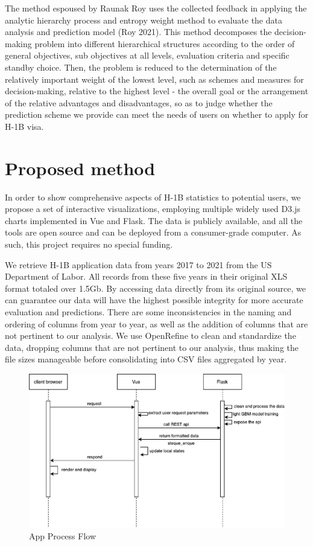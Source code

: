 \documentclass[sigconf]{acmart}
\begin{document}
The method espoused by Raunak Roy uses the collected feedback in applying the analytic hierarchy process and entropy 
weight method to evaluate the data analysis and prediction model (Roy 2021). This method decomposes the decision-making problem into different 
hierarchical structures according to the order of general objectives, sub objectives at all levels, evaluation criteria and specific 
standby choice. Then, the problem is reduced to the determination of the relatively important weight of the lowest level, such as 
schemes and measures for decision-making, relative to the highest level - the overall goal or the arrangement of the relative 
advantages and disadvantages, so as to judge whether the prediction scheme we provide can meet the needs of users on whether to 
apply for H-1B visa.


\section{Proposed method}


In order to show comprehensive aspects of H-1B statistics to potential users, we propose a set of interactive visualizations, 
employing multiple widely used D3.js charts implemented in Vue and Flask.  The data is publicly available, and all the tools 
are open source and can be deployed from a consumer-grade computer. As such, this project requires no special funding. 



We retrieve H-1B application data from years 2017 to 2021 from the US Department of Labor. All records from these five 
years in their original XLS format totaled over 1.5Gb. By accessing data directly from its original source, we can 
guarantee our data will have the highest possible integrity for more accurate evaluation and predictions. 
There are some inconsistencies in the naming and ordering of columns from year to year, as well as the addition of columns that are not pertinent to 
our analysis.  We use OpenRefine to clean and standardize the data, dropping columns that are not pertinent to our 
analysis, thus making the file sizes manageable before consolidating into CSV files aggregated by year. 
\begin{figure}
  \includegraphics[width=\linewidth]{fig4.png}
  \caption{App Process Flow}
  \label{fig:appprocessflow}
\end{figure}
\end{document}
